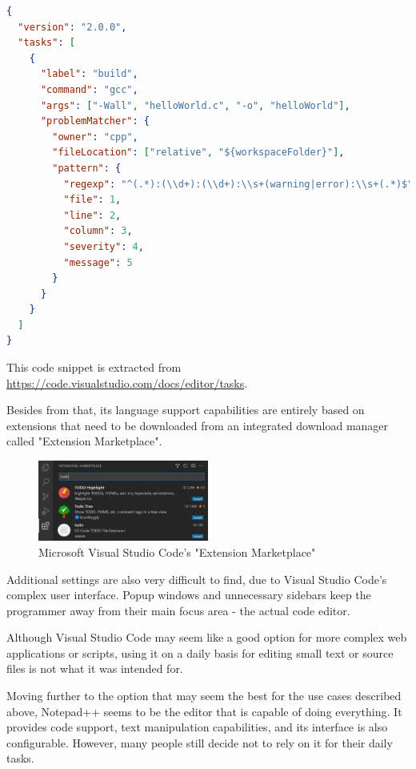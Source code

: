 \begin{lstlisting}[language=json, caption={tasks.json configuration for compiling C sources in Visual Studio Code}]
{
  "version": "2.0.0",
  "tasks": [
    {
      "label": "build",
      "command": "gcc",
      "args": ["-Wall", "helloWorld.c", "-o", "helloWorld"],
      "problemMatcher": {
        "owner": "cpp",
        "fileLocation": ["relative", "${workspaceFolder}"],
        "pattern": {
          "regexp": "^(.*):(\\d+):(\\d+):\\s+(warning|error):\\s+(.*)$",
          "file": 1,
          "line": 2,
          "column": 3,
          "severity": 4,
          "message": 5
        }
      }
    }
  ]
}
\end{lstlisting}

This code snippet is extracted from \href{https://code.visualstudio.com/docs/editor/tasks}{https://code.visualstudio.com/docs/editor/tasks}.

\hspace{0pt}

Besides from that, its language support capabilities are entirely based on extensions that need to be downloaded from an integrated download manager called "Extension Marketplace".

\begin{figure}[H]
\centering
\includegraphics[width=0.5\textwidth]{images/vscode_extensions.png}
\caption{Microsoft Visual Studio Code's "Extension Marketplace"}
\label{fig:fig2,1.}
\end{figure}

Additional settings are also very difficult to find, due to Visual Studio Code's complex user interface. Popup windows and unnecessary sidebars keep the programmer away from their main focus area - the actual code editor.

Although Visual Studio Code may seem like a good option for more complex web applications or scripts, using it on a daily basis for editing small text or source files is not what it was intended for.

Moving further to the option that may seem the best for the use cases described above, Notepad++ seems to be the editor that is capable of doing everything. It provides code support, text manipulation capabilities, and its interface is also configurable. However, many people still decide not to rely on it for their daily tasks.

